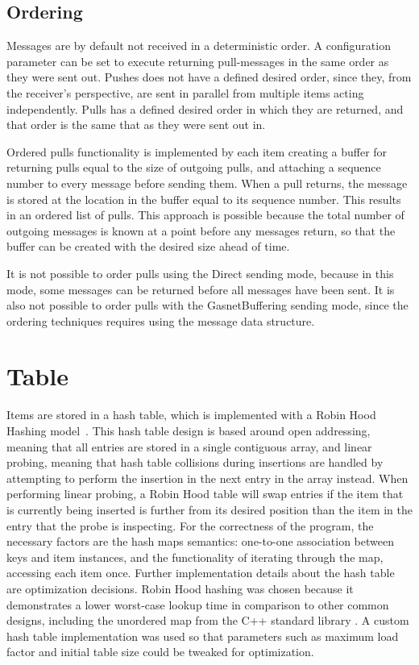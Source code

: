 \documentclass{uit-report}
\begin{document}
\subsection{Ordering}
Messages are by default not received in a deterministic order. A configuration parameter can be set to execute returning pull-messages in the same order as they were sent out. Pushes does not have a defined desired order, since they, from the receiver's perspective, are sent in parallel from multiple items acting independently. Pulls has a defined desired order in which they are returned, and that order is the same that as they were sent out in. 

Ordered pulls functionality is implemented by each item creating a buffer for returning pulls equal to the size of outgoing pulls, and attaching a sequence number to every message before sending them. When a pull returns, the message is stored at the location in the buffer equal to its sequence number. This results in an ordered list of pulls. This approach is possible because the total number of outgoing messages is known at a point before any messages return, so that the buffer can be created with the desired size ahead of time.

It is not possible to order pulls using the Direct sending mode, because in this mode, some messages can be returned before all messages have been sent. It is also not possible to order pulls with the GasnetBuffering sending mode, since the ordering techniques requires using the message data structure. 


\section{Table}
Items are stored in a hash table, which is implemented with a Robin Hood Hashing model~\cite{robinhash}. This hash table design is based around open addressing, meaning that all entries are stored in a single contiguous array, and linear probing, meaning that hash table collisions during insertions are handled by attempting to perform the insertion in the next entry in the array instead. When performing linear probing, a Robin Hood table will swap entries if the item that is currently being inserted is further from its desired position than the item in the entry that the probe is inspecting.
\newpage
For the correctness of the program, the necessary factors are the hash maps semantics: one-to-one association between keys and item instances, and the functionality of iterating through the map, accessing each item once. Further implementation details about the hash table are optimization decisions. Robin Hood hashing was chosen because it demonstrates a lower worst-case lookup time in comparison to other common designs, including the unordered map from the C++ standard library  \cite{hashbenchmark}. A custom hash table implementation was used so that parameters such as maximum load factor and initial table size could be tweaked for optimization.
\end{document}
